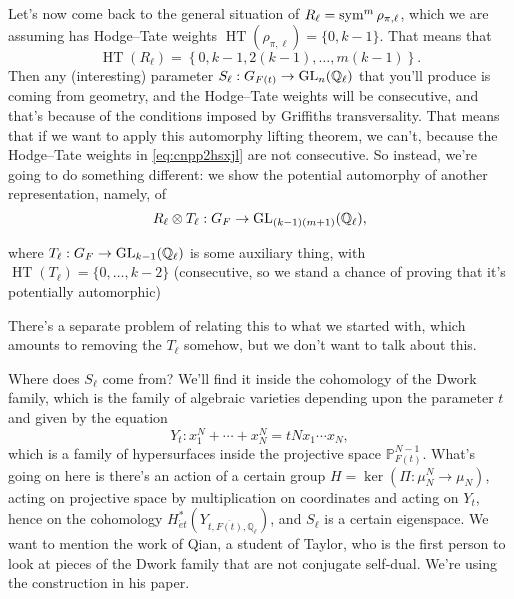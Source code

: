 \documentclass[reqno]{amsart} 
\begin{document}
Let's now come back to the general situation of $R_{\ell} = \operatorname{sym}^m \rho_{\pi, \ell}$, which we are assuming has Hodge--Tate weights $\operatorname{H T}(\rho_{\pi, \ell}) = \{0, k - 1\}$.  That means that
\begin{equation}\label{eq:cnpp2hsxjl}
  \operatorname{H T}(R_{\ell}) = \left\{ 0, k - 1, 2(k - 1), \dotsc, m(k - 1) \right\}.
\end{equation}
Then any (interesting) parameter $S_{\ell} : G_{F(t)} \rightarrow \operatorname{GL}_n(\mathbb{Q}_{\ell})$ that you'll produce is coming from geometry, and the Hodge--Tate weights will be consecutive, and that's because of the conditions imposed by Griffiths transversality.  That means that if we want to apply this automorphy lifting theorem, we can't, because the Hodge--Tate weights in \eqref{eq:cnpp2hsxjl} are not consecutive.  So instead, we're going to do something different: we show the potential automorphy of another representation, namely, of
\begin{equation*}
  R_{\ell} \otimes T_{\ell} : G_F \rightarrow \operatorname{GL}_{(k - 1)(m + 1)}(\mathbb{Q}_{\ell}),
\end{equation*}

where $T_{\ell} : G_F \rightarrow \operatorname{GL}_{k - 1}(\mathbb{Q}_{\ell})$ is some auxiliary thing, with $\operatorname{H T}(T_{\ell}) = \{0, \dotsc, k - 2\}$ (consecutive, so we stand a chance of proving that it's potentially automorphic)
\begin{remark}
  There's a separate problem of relating this to what we started with, which amounts to removing the $T_{\ell}$ somehow, but we don't want to talk about this.
\end{remark}
Where does $S_{\ell}$ come from?  We'll find it inside the cohomology of the Dwork family, which is the family of algebraic varieties depending upon the parameter $t$ and given by the equation
\begin{equation*}
  Y_t : x_1^N + \dotsb + x_N^N = t N x_1 \dotsb x_N,
\end{equation*}
which is a family of hypersurfaces inside the projective space $\mathbb{P}_{F(t)}^{N - 1}$.  What's going on here is there's an action of a certain group $H = \ker \left( \Pi : \mu_N^N \rightarrow \mu_N \right)$, acting on projective space by multiplication on coordinates and acting on $Y_t$, hence on the cohomology $H^\ast_{\acute{e}t}(Y_{t, \overline{F(t)}, \mathbb{Q}_{\ell}})$, and $S_{\ell}$ is a certain eigenspace.  We want to mention the work of Qian, a student of Taylor, who is the first person to look at pieces of the Dwork family that are not conjugate self-dual.  We're using the construction in his paper.
\end{document}
